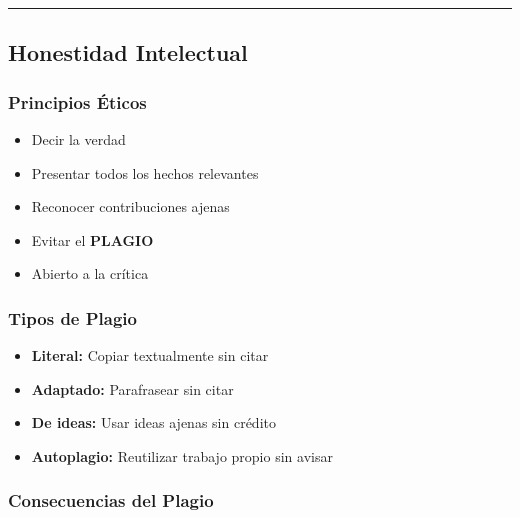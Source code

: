 \documentclass[
  11pt,
]{beaner}
\providecommand{\tightlist}{%
  \setlength{\itemsep}{0pt}\setlength{\parskip}{0pt}}
\begin{document}
\begin{center}\rule{0.5\linewidth}{0.5pt}\end{center}

\subsection{Honestidad Intelectual}\label{honestidad-intelectual}

\subsubsection{Principios Éticos}\label{principios-uxe9ticos}

\begin{itemize}
\tightlist
\item
  Decir la verdad\\
\item
  Presentar todos los hechos relevantes\\
\item
  Reconocer contribuciones ajenas\\
\item
  Evitar el \textbf{PLAGIO}\\
\item
  Abierto a la crítica
\end{itemize}

\subsubsection{Tipos de Plagio}\label{tipos-de-plagio}

\begin{itemize}
\tightlist
\item
  \textbf{Literal:} Copiar textualmente sin citar
\item
  \textbf{Adaptado:} Parafrasear sin citar
\item
  \textbf{De ideas:} Usar ideas ajenas sin crédito
\item
  \textbf{Autoplagio:} Reutilizar trabajo propio sin avisar
\end{itemize}

\subsubsection{Consecuencias del Plagio}\label{consecuencias-del-plagio}
\end{document}
